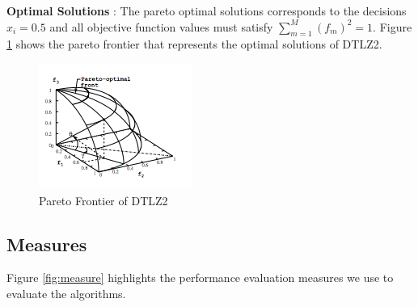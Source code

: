 \documentclass[conference]{IEEEtran}
\begin{document}
\textbf{Optimal Solutions} : The pareto optimal solutions corresponds to the decisions \(x_i = 0.5\) and all objective function values must satisfy \(\sum_{m=1}^M (f_m)^2 = 1\). Figure \ref{fig:problem} shows the pareto frontier that represents the optimal solutions of DTLZ2.

\begin{figure}
	\centering
	\includegraphics{img/dtlz2_pareto.png}
	\caption{Pareto Frontier of DTLZ2}
	\label{fig:problem}
\end{figure}

\subsection{Measures}
\label{measures}
Figure \ref{fig:measure} highlights the performance evaluation measures we use to evaluate the algorithms.
\end{document}
